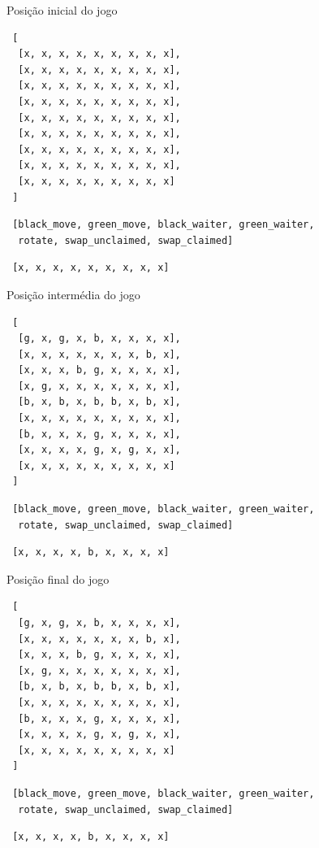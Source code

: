 \documentclass[a4paper]{article}
\begin{document}
Posição inicial do jogo
\begin{lstlisting}
 [
  [x, x, x, x, x, x, x, x, x],
  [x, x, x, x, x, x, x, x, x],
  [x, x, x, x, x, x, x, x, x],
  [x, x, x, x, x, x, x, x, x],
  [x, x, x, x, x, x, x, x, x],
  [x, x, x, x, x, x, x, x, x],
  [x, x, x, x, x, x, x, x, x],
  [x, x, x, x, x, x, x, x, x],
  [x, x, x, x, x, x, x, x, x]
 ]
\end{lstlisting}

\begin{lstlisting}
 [black_move, green_move, black_waiter, green_waiter, 
  rotate, swap_unclaimed, swap_claimed]
\end{lstlisting}

\begin{lstlisting}
 [x, x, x, x, x, x, x, x, x]
\end{lstlisting}

Posição intermédia do jogo
\begin{lstlisting}
 [
  [g, x, g, x, b, x, x, x, x],
  [x, x, x, x, x, x, x, b, x],
  [x, x, x, b, g, x, x, x, x],
  [x, g, x, x, x, x, x, x, x],
  [b, x, b, x, b, b, x, b, x],
  [x, x, x, x, x, x, x, x, x],
  [b, x, x, x, g, x, x, x, x],
  [x, x, x, x, g, x, g, x, x],
  [x, x, x, x, x, x, x, x, x]
 ]
\end{lstlisting}

\begin{lstlisting}
 [black_move, green_move, black_waiter, green_waiter, 
  rotate, swap_unclaimed, swap_claimed]
\end{lstlisting}

\begin{lstlisting}
 [x, x, x, x, b, x, x, x, x]
\end{lstlisting}

Posição final do jogo
\begin{lstlisting}
 [
  [g, x, g, x, b, x, x, x, x],
  [x, x, x, x, x, x, x, b, x],
  [x, x, x, b, g, x, x, x, x],
  [x, g, x, x, x, x, x, x, x],
  [b, x, b, x, b, b, x, b, x],
  [x, x, x, x, x, x, x, x, x],
  [b, x, x, x, g, x, x, x, x],
  [x, x, x, x, g, x, g, x, x],
  [x, x, x, x, x, x, x, x, x]
 ]
\end{lstlisting}

\begin{lstlisting}
 [black_move, green_move, black_waiter, green_waiter, 
  rotate, swap_unclaimed, swap_claimed]
\end{lstlisting}

\begin{lstlisting}
 [x, x, x, x, b, x, x, x, x]
\end{lstlisting}
\end{document}
